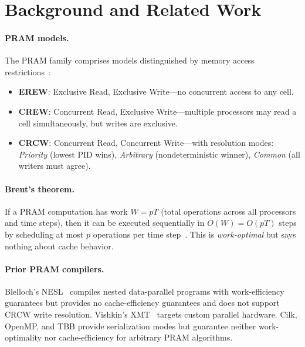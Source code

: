 \documentclass[11pt]{article}
\begin{document}
\section{Background and Related Work}
\label{sec:related}

\paragraph{PRAM models.}
The PRAM family comprises models distinguished by memory access
restrictions~\cite{jaja1992introduction}:
\begin{itemize}[leftmargin=*]
\item \textbf{EREW}: Exclusive Read, Exclusive Write---no concurrent
  access to any cell.
\item \textbf{CREW}: Concurrent Read, Exclusive Write---multiple
  processors may read a cell simultaneously, but writes are exclusive.
\item \textbf{CRCW}: Concurrent Read, Concurrent Write---with resolution
  modes: \emph{Priority} (lowest PID wins), \emph{Arbitrary}
  (nondeterministic winner), \emph{Common} (all writers must agree).
\end{itemize}

\paragraph{Brent's theorem.}
If a PRAM computation has work $W = pT$ (total operations across all
processors and time steps), then it can be executed sequentially in
$O(W) = O(pT)$ steps by scheduling at most $p$ operations per time
step~\cite{brent1974}.  This is \emph{work-optimal} but says nothing
about cache behavior.

\paragraph{Prior PRAM compilers.}
Blelloch's NESL~\cite{blelloch1996} compiles nested data-parallel programs
with work-efficiency guarantees but provides no cache-efficiency guarantees
and does not support CRCW write resolution.  Vishkin's
XMT~\cite{vishkin2011} targets custom parallel hardware.  Cilk, OpenMP, and
TBB provide serialization modes but guarantee neither work-optimality nor
cache-efficiency for arbitrary PRAM algorithms.
\end{document}
